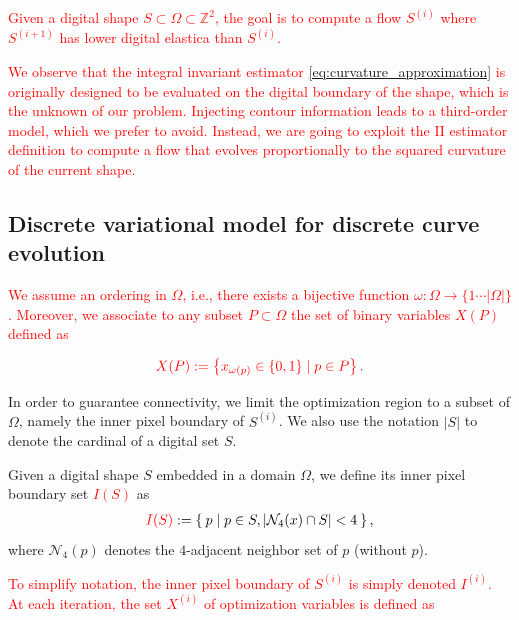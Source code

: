 \documentclass[smallextended]{svjour3}       %
\newcommand{\revision}[1]{\textcolor{red}{#1}}
\begin{document}
\revision{
Given a digital shape $S \subset \Omega \subset \mathbb{Z}^2$, the goal is to compute a flow $S^{(i)}$ where $S^{(i+1)}$ has lower digital elastica than $S^{(i)}$.}

\revision{We observe that the integral invariant estimator \eqref{eq:curvature_approximation} is originally designed to be evaluated on the digital boundary of the shape, which is the unknown of our problem. Injecting contour information leads to a third-order model, which we prefer to avoid. Instead, we are going to exploit the II estimator definition to compute a flow that evolves proportionally to the squared curvature of the current shape.}

\subsection{Discrete variational model for discrete curve evolution}

\revision{We assume an ordering in $\Omega$, i.e., there exists a bijective function $\omega : \Omega \rightarrow \{1 \cdots |\Omega| \}$. Moreover, we associate to any subset $P \subset \Omega$ the set of binary variables $X(P)$ defined as}

\begin{align*}
	\revision{X(P) := \left\{ x_{\omega(p)} \in \{0,1\} \; | \; p \in P \right\}.}
\end{align*}

In order to guarantee connectivity, we limit the optimization region to a subset of $\Omega$, namely the inner pixel boundary of  $S^{(i)}$. We also use the notation $| S |$ to denote the cardinal of a digital set $S$.

\begin{definition}

Given a digital shape $S$ embedded in a domain $\Omega$, we define its inner pixel boundary set \revision{$I(S)$} as
\begin{align*}
	\revision{I(S)} := \left\{ \: p \; | \; p \in S, |\mathcal{N}_4(x) \cap S|<4 \: \right\},
\end{align*}
where $\mathcal{N}_4(p)$ denotes the $4$-adjacent neighbor set of $p$ (without $p$).
\end{definition}



\revision{To simplify notation, the inner pixel boundary of $S^{(i)}$ is simply denoted $I^{(i)}$. At each iteration, the set $X^{(i)}$ of optimization variables is defined as}
\end{document}
